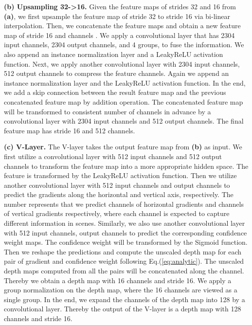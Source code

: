 \documentclass{article} \usepackage{iclr2023_conference, times}
\newcommand{\formattedparagraph}[1]{\noindent \textbf{#1}}
\begin{document}
\formattedparagraph{(b) Upsampling 32->16.} Given the feature maps of strides 32 and 16 from \textbf{(a)}, we first upsample the feature map of stride 32 to stride 16 via bi-linear interpolation. Then, we concatenate the feature maps and obtain a new feature map of stride 16 and channels . We apply a convolutional layer that has 2304 input channels, 2304 output channels, and 4 groups, to fuse the information. We also append an instance normalization layer \citep{ulyanov2016instance} and a LeakyReLU activation function. Next, we apply another convolutional layer with  2304 input channels, 512 output channels to compress the feature channels. Again we append an instance normalization layer and the LeakyReLU activation function. In the end, we add a skip connection between the result feature map and the previous concatenated feature map by addition operation. The concatenated feature map will be transformed to consistent number of channels in advance by a convolutional layer with 2304 input channels and 512 output channels. The final feature map has stride 16 and 512 channels.

\formattedparagraph{(c) V-Layer.} The V-layer takes the output feature map from \textbf{(b)} as input. We first utilize a convolutional layer with 512 input channels and 512 output channels to transform the feature map into a more appropriate hidden space. The feature is transformed by the LeakyReLU activation function. Then we utilize another convolutional layer with 512 input channels and  output channels to predict the gradients along the horizontal and vertical axis, respectively. The number  represents that we predict  channels of horizontal gradients and  channels of vertical gradients respectively, where each channel is expected to capture different information in scenes. Similarly, we also use another convolutional layer with 512 input channels,  output channels to predict the corresponding confidence weight maps. The confidence weight will be transformed by the Sigmoid function. Then we reshape the predictions and compute the unscaled depth map for each pair of gradient and confidence weight following Eq.(\ref{eq:analytic}). The unscaled depth maps computed from all the pairs will be concatenated along the channel. Thereby we obtain a depth map with 16 channels and stride 16. We apply a group normalization on the depth map, where the 16 channels are viewed as a single group. In the end, we expand the channels of the depth map into 128 by a convolutional layer. Thereby the output of the V-layer is a depth map with 128 channels and stride 16.
\end{document}
